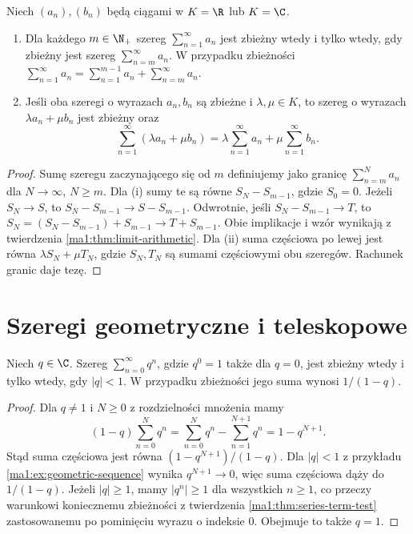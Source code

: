 \begin{twierdzenie}
\label{ma1:thm:series-linear-tail}
Niech $(a_n),(b_n)$ będą ciągami w $K=\R$ lub $K=\C$.
\begin{enumerate}[label=(\roman*)]
\item Dla każdego $m\in\N_+$ szereg $\sum_{n=1}^\infty a_n$ jest zbieżny wtedy i tylko wtedy, gdy zbieżny jest szereg $\sum_{n=m}^\infty a_n$. W przypadku zbieżności
$\sum_{n=1}^\infty a_n=\sum_{n=1}^{m-1}a_n+\sum_{n=m}^\infty a_n$.
\item Jeśli oba szeregi o wyrazach $a_n,b_n$ są zbieżne i $\lambda,\mu\in K$, to szereg o wyrazach $\lambda a_n+\mu b_n$ jest zbieżny oraz
\[
 \sum_{n=1}^\infty(\lambda a_n+\mu b_n)
 =\lambda\sum_{n=1}^\infty a_n+\mu\sum_{n=1}^\infty b_n.
\]
\end{enumerate}
\end{twierdzenie}
\begin{proof}
Sumę szeregu zaczynającego się od $m$ definiujemy jako granicę $\sum_{n=m}^N a_n$ dla $N\to\infty$, $N\ge m$. Dla (i) sumy te są równe $S_N-S_{m-1}$, gdzie $S_0=0$. Jeżeli $S_N\to S$, to $S_N-S_{m-1}\to S-S_{m-1}$. Odwrotnie, jeśli $S_N-S_{m-1}\to T$, to $S_N=(S_N-S_{m-1})+S_{m-1}\to T+S_{m-1}$. Obie implikacje i wzór wynikają z twierdzenia \ref{ma1:thm:limit-arithmetic}. Dla (ii) suma częściowa po lewej jest równa $\lambda S_N+\mu T_N$, gdzie $S_N,T_N$ są sumami częściowymi obu szeregów. Rachunek granic daje tezę.
\end{proof}

\section{Szeregi geometryczne i teleskopowe}
\begin{twierdzenie}
\label{ma1:thm:geometric-series}
Niech $q\in\C$. Szereg $\sum_{n=0}^\infty q^n$, gdzie $q^0=1$ także dla $q=0$, jest zbieżny wtedy i tylko wtedy, gdy $|q|<1$. W przypadku zbieżności jego suma wynosi $1/(1-q)$.
\end{twierdzenie}
\begin{proof}
Dla $q\ne1$ i $N\ge0$ z rozdzielności mnożenia mamy
\[
 (1-q)\sum_{n=0}^N q^n=\sum_{n=0}^N q^n-\sum_{n=1}^{N+1}q^n
 =1-q^{N+1}.
\]
Stąd suma częściowa jest równa $(1-q^{N+1})/(1-q)$. Dla $|q|<1$ z przykładu \ref{ma1:ex:geometric-sequence} wynika $q^{N+1}\to0$, więc suma częściowa dąży do $1/(1-q)$. Jeżeli $|q|\ge1$, mamy $|q^n|\ge1$ dla wszystkich $n\ge1$, co przeczy warunkowi koniecznemu zbieżności z twierdzenia \ref{ma1:thm:series-term-test} zastosowanemu po pominięciu wyrazu o indeksie $0$. Obejmuje to także $q=1$.
\end{proof}

